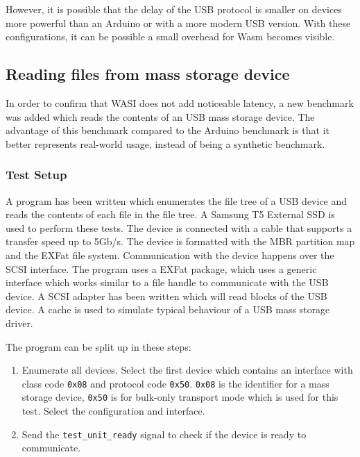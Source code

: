 However, it is possible that the delay of the USB protocol is smaller on devices more powerful than an Arduino or with a more modern USB version. With these configurations, it can be possible a small overhead for Wasm becomes visible.

\subsection{Reading files from mass storage device}

In order to confirm that WASI does not add noticeable latency, a new benchmark was added which reads the contents of an USB mass storage device. The advantage of this benchmark compared to the Arduino benchmark is that it better represents real-world usage, instead of being a synthetic benchmark.

\subsubsection{Test Setup}
A program has been written which enumerates the file tree of a USB device and reads the contents of each file in the file tree. A Samsung T5 External SSD is used to perform these tests. The device is connected with a cable that supports a transfer speed up to 5Gb/s. The device is formatted with the MBR partition map and the EXFat file system. Communication with the device happens over the SCSI interface. The program uses a EXFat package, which uses a generic interface which works similar to a file handle to communicate with the USB device. A SCSI adapter has been written which will read blocks of the USB device. A cache is used to simulate typical behaviour of a USB mass storage driver.

The program can be split up in these steps:

\begin{enumerate}
\item Enumerate all devices. Select the first device which contains an interface with class code \texttt{0x08} and protocol code \texttt{0x50}. \texttt{0x08} is the identifier for a mass storage device, \texttt{0x50} is for bulk-only transport mode which is used for this test. Select the configuration and interface.

\item Send the \texttt{test\_unit\_ready} signal to check if the device is ready to communicate.

 
\end{enumerate}


